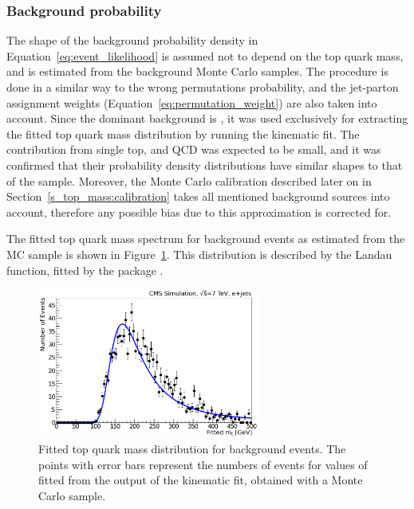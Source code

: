 \subsubsection*{Background probability}

The shape of the background probability density in Equation~\ref{eq:event_likelihood} is assumed not to depend on the
top quark mass, and is estimated from the background Monte Carlo samples. The procedure is done in a similar way to the
wrong permutations probability, and the jet-parton assignment weights (Equation~\ref{eq:permutation_weight}) are also
taken into account. Since the dominant background is \WpJets, it was used exclusively for extracting the fitted top
quark mass distribution by running the kinematic fit. The contribution from single top, \ZpJets and QCD was expected to
be small, and it was confirmed that their probability density distributions have similar shapes to that of the \WpJets
sample. Moreover, the Monte Carlo calibration described later on in Section~\ref{s_top_mass:calibration} takes all
mentioned background sources into account, therefore any possible bias due to this approximation is corrected for.

The fitted top quark mass spectrum for background events as estimated from the \WpJets MC sample is shown in
Figure~\ref{fig:background_wjets_fitted_top_mass}. This distribution is described by the Landau function, fitted by the
\ROOT package \autocite{Landau}.

\begin{figure}[!htpb]
	\centering
	\includegraphics[width=0.65\textwidth]{background_wjets_fitted_top_mass}
	\caption[Fitted top quark mass distribution for background events]{Fitted top quark mass distribution for background
	events. The points with error bars represent the numbers of events for values of fitted \mtop from the output of the
	kinematic fit, obtained with a \WpJets Monte Carlo sample.}
	\label{fig:background_wjets_fitted_top_mass}
\end{figure}


